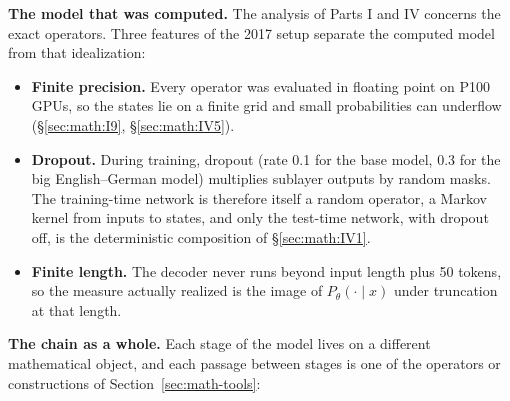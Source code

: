 \textbf{The model that was computed.} The analysis of Parts I and IV
concerns the exact operators. Three features of the 2017 setup separate
the computed model from that idealization:

\begin{itemize}
\tightlist
\item
  \textbf{Finite precision.} Every operator was evaluated in floating
  point on P100 GPUs, so the states lie on a finite grid and small
  probabilities can underflow (\S\ref{sec:math:I9}, \S\ref{sec:math:IV5}).
\item
  \textbf{Dropout.} During training, dropout (rate 0.1 for the base model, 0.3 for the big English--German
  model) multiplies
  sublayer outputs by random masks. The training-time network is
  therefore itself a random operator, a Markov kernel from inputs to
  states, and only the test-time network, with dropout off, is the
  deterministic composition of \S\ref{sec:math:IV1}.
\item
  \textbf{Finite length.} The decoder never runs beyond input length
  plus 50 tokens, so the measure actually realized is the image of
  \(P_\theta(\cdot \mid x)\) under truncation at that length.
\end{itemize}

\textbf{The chain as a whole.} Each stage of the model lives on a
different mathematical object, and each passage between stages is one of
the operators or constructions of Section~\ref{sec:math-tools}:

